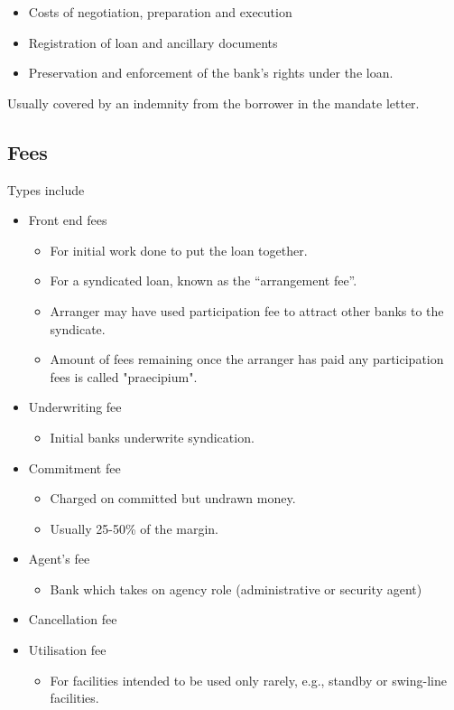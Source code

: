 \documentclass[
]{article}
\providecommand{\tightlist}{%
  \setlength{\itemsep}{0pt}\setlength{\parskip}{0pt}}
\begin{document}
\begin{itemize}
\tightlist
\item
  Costs of negotiation, preparation and execution
\item
  Registration of loan and ancillary documents
\item
  Preservation and enforcement of the bank's rights under the loan.
\end{itemize}

Usually covered by an indemnity from the borrower in the mandate letter.

\hypertarget{fees}{%
\subsection{Fees}\label{fees}}

Types include

\begin{itemize}
\tightlist
\item
  Front end fees

  \begin{itemize}
  \tightlist
  \item
    For initial work done to put the loan together.
  \item
    For a syndicated loan, known as the ``arrangement fee''.
  \item
    Arranger may have used participation fee to attract other banks to
    the syndicate.
  \item
    Amount of fees remaining once the arranger has paid any
    participation fees is called "praecipium".
  \end{itemize}
\item
  Underwriting fee

  \begin{itemize}
  \tightlist
  \item
    Initial banks underwrite syndication.
  \end{itemize}
\item
  Commitment fee

  \begin{itemize}
  \tightlist
  \item
    Charged on committed but undrawn money.
  \item
    Usually 25-50\% of the margin.
  \end{itemize}
\item
  Agent's fee

  \begin{itemize}
  \tightlist
  \item
    Bank which takes on agency role (administrative or security agent)
  \end{itemize}
\item
  Cancellation fee
\item
  Utilisation fee

  \begin{itemize}
  \tightlist
  \item
    For facilities intended to be used only rarely, e.g., standby or
    swing-line facilities.
  \end{itemize}
\end{itemize}
\end{document}
